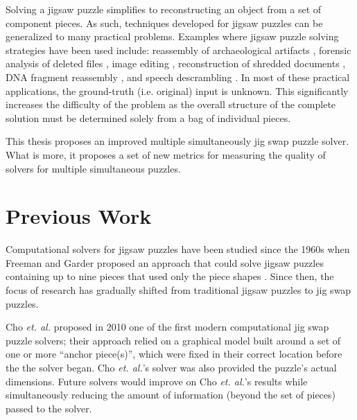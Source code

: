 \documentclass{report}
\begin{document}
Solving a jigsaw puzzle simplifies to reconstructing an object from a set of component pieces.  As such, techniques developed for jigsaw puzzles can be generalized to many practical problems.  Examples where jigsaw puzzle solving strategies have been used include: reassembly of archaeological artifacts \cite{brown2008, koller2006}, forensic analysis of deleted files \cite{garfinkel2010}, image editing \cite{cho2008}, reconstruction of shredded documents \cite{zhu2008}, DNA fragment reassembly \cite{marande2007}, and speech descrambling \cite{zhao2007}.  In most of these practical applications, the ground-truth (i.e. original) input  is unknown.  This significantly increases the difficulty of the problem as the overall structure of the complete solution must be determined solely from a bag of individual pieces.

This thesis proposes an improved multiple simultaneously jig swap puzzle solver.  What is more, it proposes a set of new metrics for measuring the quality of solvers for multiple simultaneous puzzles.













\pagebreak
\section{Previous Work}\label{sec:previousWork}

Computational solvers for jigsaw puzzles have been studied since the 1960s when Freeman and Garder proposed an approach that could solve jigsaw puzzles containing up to nine pieces that used only the piece shapes \cite{freeman1964}.  Since then, the focus of research has gradually shifted from traditional jigsaw puzzles to jig swap puzzles.  

Cho \textit{et. al.} \citep{cho2010} proposed in 2010 one of the first modern computational jig swap puzzle solvers; their approach relied on a graphical model built around a set of one or more ``anchor piece(s)'', which were fixed in their correct location before the the solver began.  Cho \textit{et. al.}'s solver was also provided the puzzle's actual dimensions.  Future solvers would improve on Cho \textit{et. al.}'s results while simultaneously reducing the amount of information (beyond the set of pieces) passed to the solver.
\end{document}
